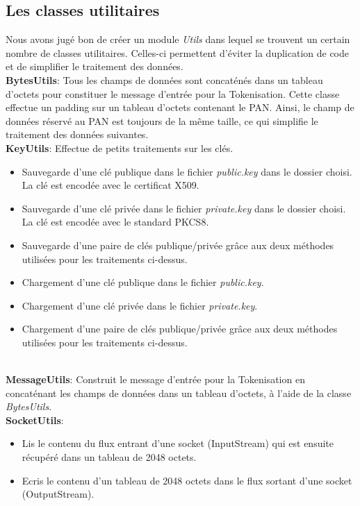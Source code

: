 \documentclass{report}
\begin{document}
\subsection{Les classes utilitaires}
Nous avons jugé bon de créer un module \textit{Utils} dans lequel se trouvent un certain nombre de classes utilitaires. Celles-ci permettent d'éviter la duplication de code et de simplifier le traitement des données.\\

\noindent
\textbf{BytesUtils}: Tous les champs de données sont concaténés dans un tableau d'octets pour constituer le message d'entrée pour la Tokenisation. Cette classe effectue un padding sur un tableau d'octets contenant le PAN. Ainsi, le champ de données réservé au PAN est toujours de la même taille, ce qui simplifie le traitement des données suivantes.\\

\noindent
\textbf{KeyUtils}: Effectue de petits traitements sur les clés.
\begin{itemize}
	\item Sauvegarde d'une clé publique dans le fichier \textit{public.key} dans le dossier choisi. La clé est encodée avec le certificat X509.
	\item Sauvegarde d'une clé privée dans le fichier \textit{private.key} dans le dossier choisi. La clé est encodée avec le standard PKCS8.
	\item Sauvegarde d'une paire de clés publique/privée grâce aux deux méthodes utilisées pour les traitements ci-dessus.
	\item Chargement d'une clé publique dans le fichier \textit{public.key}.
	\item Chargement d'une clé privée dans le fichier \textit{private.key}.
	\item Chargement d'une paire de clés publique/privée grâce aux deux méthodes utilisées pour les traitements ci-dessus.
\end{itemize}

~\\
\noindent
\textbf{MessageUtils}: Construit le message d'entrée pour la Tokenisation en concaténant les champs de données dans un tableau d'octets, à l'aide de la classe \textit{BytesUtils}.\\

\noindent
\textbf{SocketUtils}: 
\begin{itemize}
	\item Lis le contenu du flux entrant d'une socket (InputStream) qui est ensuite récupéré dans un tableau de 2048 octets.
	\item Ecris le contenu d'un tableau de 2048 octets dans le flux sortant d'une socket (OutputStream).
\end{itemize}
\end{document}
